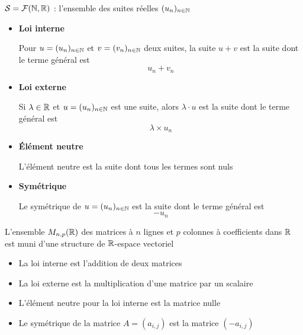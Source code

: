 \begin{frame}

\centerline{}

\bigskip

$\mathcal{S}= \mathcal{F}(\mathbb{N}, \mathbb{R})$ : l'ensemble des suites réelles $(u_n)_{n\in \mathbb{N}}$

\pause 
\begin{itemize}
  \item  \textbf{Loi interne}  
  
Pour $u=(u_n)_{n \in \mathbb{N}}$ et $v=(v_n)_{n \in \mathbb{N}}$ deux suites, la suite $u+v$ 
est la suite dont le terme général est 
$$u_n+v_n$$ 

\pause
  \item \textbf{Loi externe}   
  
Si $\lambda \in \mathbb{R}$  et $u=(u_n)_{n \in \mathbb{N}}$ est une suite, 
alors $\lambda \cdot u$ est la suite dont le terme général est
 $$\lambda \times u_n$$
  
\pause 
  \item \textbf{\'Elément neutre}  
  
  L'élément neutre est la suite dont tous les termes sont nuls

\pause  
  \item \textbf{Symétrique}  
  
  Le symétrique de $u=(u_n)_{n \in \mathbb{N}}$ est la suite dont le terme général est
 $$-u_n$$

\end{itemize}

\end{frame}

\begin{frame}\centerline{}

\bigskip

L'ensemble $M_{n,p}(\mathbb{R})$ des matrices à $n$ lignes et $p$ colonnes à coefficients 
dans $\mathbb{R}$ est muni d'une structure de $\mathbb{R}$-espace vectoriel

\pause
\bigskip

\begin{itemize}
  \item La loi interne est l'addition de deux matrices
  \item La loi externe est la multiplication d'une matrice par un scalaire
  \item L'élément neutre pour la loi interne est la matrice nulle
  \item Le symétrique de la matrice $A=(a_{i,j})$ est la matrice 
 $(-a_{i,j})$
\end{itemize}

\end{frame}

